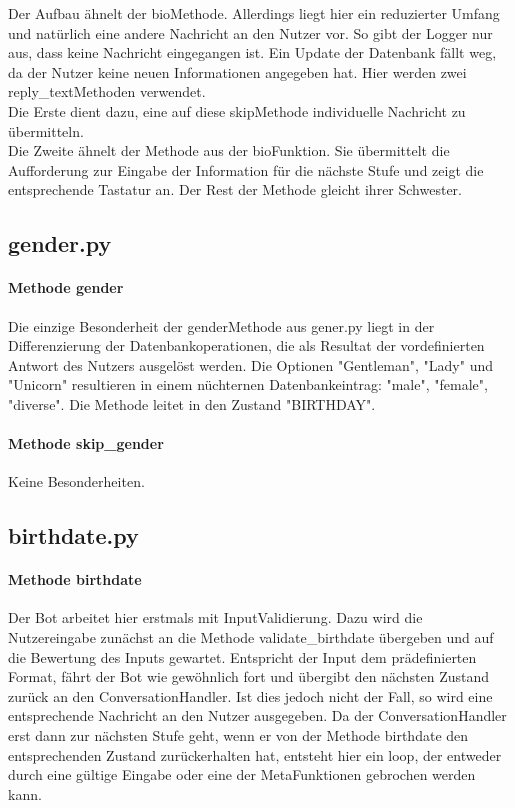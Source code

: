                 Der Aufbau ähnelt der bio\-Methode. Allerdings liegt hier ein reduzierter Umfang und natürlich eine andere Nachricht an den Nutzer vor. So gibt der Logger nur aus, dass keine Nachricht eingegangen ist. Ein Update der Datenbank fällt weg, da der Nutzer keine neuen Informationen angegeben hat. Hier werden zwei reply\_text\-Methoden verwendet. \\
                Die Erste dient dazu, eine auf diese skip\-Methode individuelle Nachricht zu übermitteln. \\
                Die Zweite ähnelt der Methode aus der bio\-Funktion. Sie übermittelt die Aufforderung zur Eingabe der Information für die nächste Stufe und zeigt die entsprechende Tastatur an. Der Rest der Methode gleicht ihrer Schwester.


        \subsection{gender.py}
            \paragraph{Methode gender}
                Die einzige Besonderheit der gender\-Methode aus gener.py liegt in der Differenzierung der Datenbankoperationen, die als Resultat der vordefinierten Antwort des Nutzers ausgelöst werden. Die Optionen "Gentleman", "Lady" und "Unicorn" resultieren in einem nüchternen Datenbankeintrag: "male", "female", "diverse". Die Methode leitet in den Zustand "BIRTHDAY".
            
            \paragraph{Methode skip\_gender}
                Keine Besonderheiten. 
        

        \subsection{birthdate.py}
            \paragraph{Methode birthdate}
                Der Bot arbeitet hier erstmals mit Input\-Validierung. Dazu wird die Nutzereingabe zunächst an die Methode validate\_birthdate übergeben und auf die Bewertung des Inputs gewartet. Entspricht der Input dem prädefinierten Format, fährt der Bot wie gewöhnlich fort und übergibt den nächsten Zustand zurück an den ConversationHandler. Ist dies jedoch nicht der Fall, so wird eine entsprechende Nachricht an den Nutzer ausgegeben. Da der ConversationHandler erst dann zur nächsten Stufe geht, wenn er von der Methode birthdate den entsprechenden Zustand zurückerhalten hat, entsteht hier ein loop, der entweder durch eine gültige Eingabe oder eine der Meta\-Funktionen gebrochen werden kann.
        
